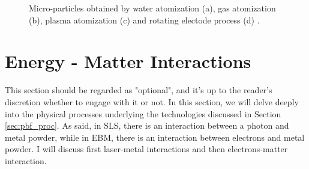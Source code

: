 \begin{figure}
{    }
    \qquad
    
    \caption[Powders from atomization processes]{Micro-particles obtained by water atomization (a), gas atomization (b), plasma atomization (c) and rotating electode process (d) \cite{slotwinski_characterization_2014}.}
    \label{fig:powders}
\end{figure}


\section{Energy - Matter Interactions}
\label{sec:matterint}
This section should be regarded as "optional", and it's up to the reader's discretion whether to engage with it or not. In this section, we will delve deeply into the physical processes underlying the technologies discussed in Section \ref{sec:pbf_proc}. As said, in SLS, there is an interaction between a photon and metal powder, while in EBM, there is an interaction between electrons and metal powder. I will discuss first laser-metal interactions and then electrons-matter interaction.
